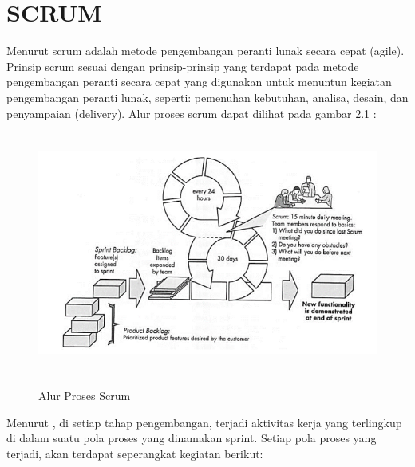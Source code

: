 \section{\uppercase{Scrum}}
Menurut \cite{pressman2010} scrum adalah metode pengembangan peranti lunak secara cepat (agile). Prinsip scrum sesuai dengan prinsip-prinsip yang terdapat pada metode pengembangan peranti secara cepat yang digunakan untuk menuntun kegiatan pengembangan peranti lunak, seperti: pemenuhan kebutuhan, analisa, desain, dan penyampaian (delivery). Alur proses scrum dapat dilihat pada gambar 2.1 \citep{pressman2010}: 

\begin{figure}[H]
\centering
{\includegraphics [width = 12.5cm, height= 8cm]{gambar/alur_proses_scrum}}
\caption{Alur Proses Scrum}
\label{alur_proses_scrum}
\end{figure}	

\par Menurut \cite{pressman2010}, di setiap tahap pengembangan, terjadi aktivitas kerja yang terlingkup di dalam suatu pola proses yang dinamakan sprint. Setiap pola proses yang terjadi, akan terdapat seperangkat kegiatan berikut: 

